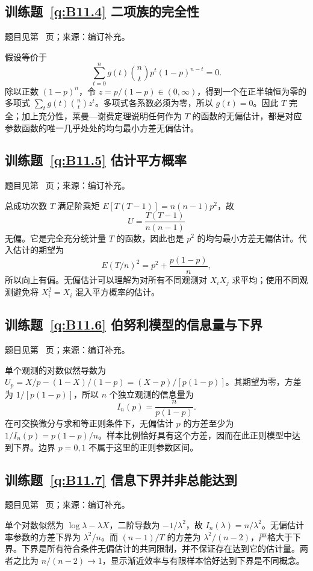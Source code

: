 \documentclass[UTF8,12pt,a4paper,fontset=fandol]{ctexbook}
\begin{document}
\subsection*{训练题~\ref{q:B11.4} 二项族的完全性}\label{a:B11.4}{\small 题目见第~\pageref{q:B11.4} 页；来源：编订补充。}
\begin{solve}假设等价于\[\sum_{t=0}^ng(t)\binom nt p^t(1-p)^{n-t}=0.\]除以正数 $(1-p)^n$，令 $z=p/(1-p)\in(0,\infty)$，得到一个在正半轴恒为零的多项式 $\sum_tg(t)\binom ntz^t$。多项式各系数必须为零，所以 $g(t)=0$。因此 $T$ 完全；加上充分性，莱曼—谢费定理说明任何作为 $T$ 的函数的无偏估计，都是对应参数函数的唯一几乎处处的均匀最小方差无偏估计。\end{solve}

\subsection*{训练题~\ref{q:B11.5} 估计平方概率}\label{a:B11.5}{\small 题目见第~\pageref{q:B11.5} 页；来源：编订补充。}
\begin{solve}总成功次数 $T$ 满足阶乘矩 $E[T(T-1)]=n(n-1)p^2$，故\[U=\frac{T(T-1)}{n(n-1)}\]无偏。它是完全充分统计量 $T$ 的函数，因此也是 $p^2$ 的均匀最小方差无偏估计。代入估计的期望为\[E(T/n)^2=p^2+\frac{p(1-p)}n,\]所以向上有偏。无偏估计可以理解为对所有不同观测对 $X_iX_j$ 求平均；使用不同观测避免将 $X_i^2=X_i$ 混入平方概率的估计。\end{solve}

\subsection*{训练题~\ref{q:B11.6} 伯努利模型的信息量与下界}\label{a:B11.6}{\small 题目见第~\pageref{q:B11.6} 页；来源：编订补充。}
\begin{solve}单个观测的对数似然导数为 $U_p=X/p-(1-X)/(1-p)=(X-p)/[p(1-p)]$。其期望为零，方差为 $1/[p(1-p)]$，所以 $n$ 个独立观测的信息量为\[I_n(p)=\frac{n}{p(1-p)}.\]在可交换微分与求和等正则条件下，无偏估计 $p$ 的方差至少为 $1/I_n(p)=p(1-p)/n$。样本比例恰好具有这个方差，因而在此正则模型中达到下界。边界 $p=0,1$ 不属于这里的正则参数区间。\end{solve}

\subsection*{训练题~\ref{q:B11.7} 信息下界并非总能达到}\label{a:B11.7}{\small 题目见第~\pageref{q:B11.7} 页；来源：编订补充。}
\begin{solve}单个对数似然为 $\log\lambda-\lambda X$，二阶导数为 $-1/\lambda^2$，故 $I_n(\lambda)=n/\lambda^2$。无偏估计率参数的方差下界为 $\lambda^2/n$。而 $(n-1)/T$ 的方差为 $\lambda^2/(n-2)$，严格大于下界。下界是所有符合条件无偏估计的共同限制，并不保证存在达到它的估计量。两者之比为 $n/(n-2)\to1$，显示渐近效率与有限样本恰好达到下界是不同概念。\end{solve}
\end{document}
